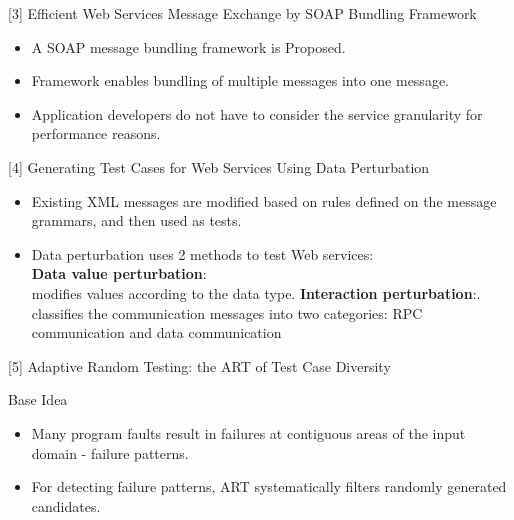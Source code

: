 \documentclass{bredelebeamer}
\begin{document}
\begin{frame}{[3] Efficient Web Services Message Exchange by SOAP Bundling Framework}
	\begin{block}{}
		\large
		\begin{itemize}
			\item A SOAP message bundling framework is Proposed.
			\newline
			\item Framework enables bundling of multiple messages into one message.
			\newline
			\item Application developers do not have to consider the service granularity for performance reasons.
			\newline
		\end{itemize}
	\end{block}
\end{frame}

\begin{frame}{[4] Generating Test Cases for Web Services Using Data Perturbation}
	\begin{itemize}
		\large
		\item Existing XML messages are modified based on rules defined on the message grammars, and then used as tests.
		\newline
		\item Data perturbation uses 2 methods to test Web services:\\
		 \textbf{Data value perturbation}:\\ modifies values according to the data type.
		 \newline
		 \textbf{Interaction perturbation}:.\\classifies the communication messages into two categories: RPC communication and data communication
		
	\end{itemize}
\end{frame}

\begin{frame}{[5] Adaptive Random Testing: the ART of Test Case Diversity}
	
	
	\begin{block}{Base Idea}
		
		\begin{itemize}
			\LARGE
			\item Many program faults result in failures at contiguous areas of the input domain - failure patterns.\newline
			\item For detecting failure patterns, ART systematically filters randomly generated candidates.
		\end{itemize}
	\end{block}
\end{frame}
\end{document}
